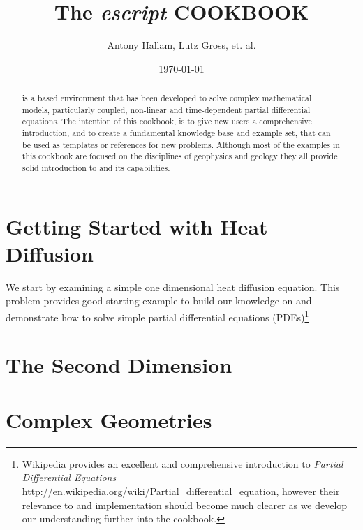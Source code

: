 \documentclass{manual}
\title{The \textit{escript} COOKBOOK}
\author{Antony Hallam, Lutz Gross, et. al.}
\date{\today}
\begin{document}
\maketitle

\ifpdf
{}
\fi



\begin{abstract}
\esc is a \pyt based environment that has been developed to solve complex mathematical models, particularly coupled, non-linear and time-dependent partial differential equations. The intention of this cookbook, is to give new \esc users a comprehensive introduction, and to create a fundamental knowledge base and example set, that can be used as templates or references for new problems. Although most of the examples in this cookbook are focused on the disciplines of geophysics and geology they all provide solid introduction to \esc and its capabilities.
\end{abstract}
\tableofcontents

\newpage




\chapter{Getting Started with Heat Diffusion}
\label{CHAP HEAT DIFF}
We start by examining a simple one dimensional heat diffusion equation. This problem provides good starting example to build our knowledge on \esc and demonstrate how to solve simple partial differential equations (PDEs)\footnote{Wikipedia provides an excellent and comprehensive introduction to \textit{Partial Differential Equations} \url{http://en.wikipedia.org/wiki/Partial_differential_equation}, however their relevance to \esc and implementation should become much clearer as we develop our understanding further into the cookbook.}



\chapter{The Second Dimension}
\label{CHAP HEAT 2a}



\chapter{Complex Geometries}
\label{CHAP HEAT 2}


% 


\end{document}
